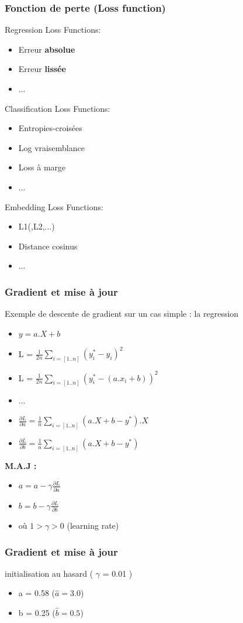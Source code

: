 \documentclass{formation}
\begin{document}
\begin{frame}
  \frametitle{Fonction de perte (\textbf{Loss} function)}
  Regression Loss Functions:
  \begin{itemize}
  \item Erreur \textbf{absolue}
  \item Erreur \textbf{lissée}
  \item ...
  \end{itemize}
  Classification Loss Functions:
  \begin{itemize}
  \item Entropies-croisées
  \item Log vraisemblance
  \item Loss à marge
  \item ...
  \end{itemize}
  Embedding Loss Functions:
  \begin{itemize}
  \item L1(,L2,...)
  \item Distance cosinus
  \item ...
  \end{itemize}
\end{frame}

\begin{frame}
  \frametitle{Gradient et mise à jour}
  Exemple de descente de gradient sur un cas simple : la regression
  \begin{itemize}
  \item $y = a.X+b$
  \item L = $\frac{1}{2n}\sum_{i=[1..n]}( y_i^* - y_i )^2$
  \item L = $\frac{1}{2n}\sum_{i=[1..n]}( y_i^* - (a.x_i+b) )^2$
  \item ...
  \item $\frac{\partial{L}}{\partial{a}} = \frac{1}{n}\sum_{i=[1..n]}(a.X+b - y^*).X$
  \item $\frac{\partial{L}}{\partial{b}} = \frac{1}{n}\sum_{i=[1..n]}(a.X+b - y^*)$
  \end{itemize}
  \textbf{M.A.J :}
  \begin{itemize}
  \item $a = a - \gamma\frac{\partial{L}}{\partial{a}}$
  \item $b = b - \gamma\frac{\partial{L}}{\partial{b}}$
  \item où $1 > \gamma > 0$ (learning rate)
  \end{itemize}
\end{frame}

\begin{frame}
  \frametitle{Gradient et mise à jour}
  initialisation au hasard ( $\gamma$ = 0.01 )
  \begin{itemize}
  \item a = 0.58 ($\hat{a} = 3.0$)
  \item b = 0.25 ($\hat{b} = 0.5$)
  \end{itemize}
\end{frame}
\end{document}
